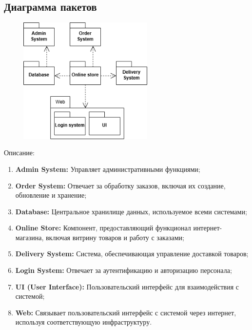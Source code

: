 \documentclass[a4paper]{report}
\begin{document}
\subsection{Диаграмма пакетов}
\begin{figure}[H]
    \centering
    \includegraphics[width=0.6\textwidth]{Диаграмма пакетов.png}
\end{figure}
Описание:
\begin{enumerate}
    \item \textbf{Admin System:} Управляет административными функциями;
    \item \textbf{Order System:} Отвечает за обработку заказов, включая их создание, обновление и хранение;
    \item \textbf{Database:} Центральное хранилище данных, используемое всеми системами;
    \item \textbf{Online Store:} Компонент, предоставляющий функционал интернет-магазина, включая витрину товаров и работу с заказами;
    \item \textbf{Delivery System:} Система, обеспечивающая управление доставкой товаров;
    \item \textbf{Login System:} Отвечает за аутентификацию и авторизацию персонала;
    \item \textbf{UI (User Interface):} Пользовательский интерфейс для взаимодействия с системой;
    \item \textbf{Web:} Связывает пользовательский интерфейс с системой через интернет, используя соответствующую инфраструктуру.
\end{enumerate}
\end{document}
